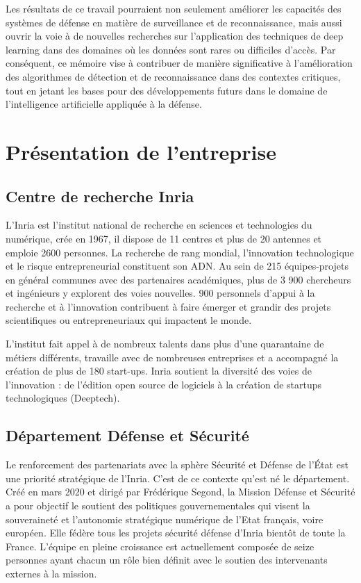 Les résultats de ce travail pourraient non seulement améliorer les capacités des systèmes de défense en matière de surveillance et de reconnaissance, mais aussi ouvrir la voie à de nouvelles recherches sur l'application des techniques de deep learning dans des domaines où les données sont rares ou difficiles d'accès.
Par conséquent, ce mémoire vise à contribuer de manière significative à l'amélioration des algorithmes de détection et de reconnaissance dans des contextes critiques, tout en jetant les bases pour des développements futurs dans le domaine de l'intelligence artificielle appliquée à la défense.


\newpage

\section{Présentation de l'entreprise}
\subsection{Centre de recherche Inria}
L’Inria est l’institut national de recherche en sciences et technologies du numérique, crée en 1967, il dispose de 11 centres et plus de 20 antennes et emploie 2600 personnes. La recherche de rang mondial, l’innovation technologique et le risque entrepreneurial constituent son ADN.
Au sein de 215 équipes-projets en général communes avec des partenaires académiques, plus de 3 900 chercheurs et ingénieurs y explorent des voies nouvelles. 900 personnels d’appui à la recherche et à l’innovation contribuent à faire émerger et grandir des projets scientifiques ou entrepreneuriaux qui impactent le monde.

L’institut fait appel à de nombreux talents dans plus d’une quarantaine de métiers différents, travaille avec de nombreuses entreprises et a accompagné la création de plus de 180 start-ups.
Inria soutient la diversité des voies de l’innovation : de l’édition open source de logiciels à la création de startups technologiques (Deeptech).


\subsection{Département Défense et Sécurité}
Le renforcement des partenariats avec la sphère Sécurité et Défense de l’État est une priorité stratégique de l’Inria. C’est de ce contexte qu’est né le département. Créé en mars 2020 et dirigé par Frédérique Segond, la Mission Défense et Sécurité a pour objectif le soutient des politiques gouvernementales qui visent la souveraineté et l’autonomie stratégique numérique de l’Etat français, voire européen. Elle fédère tous les projets sécurité défense d’Inria bientôt de toute la France.
L’équipe en pleine croissance est actuellement composée de seize personnes ayant chacun un rôle bien définit avec le soutien des intervenants externes à la mission.

